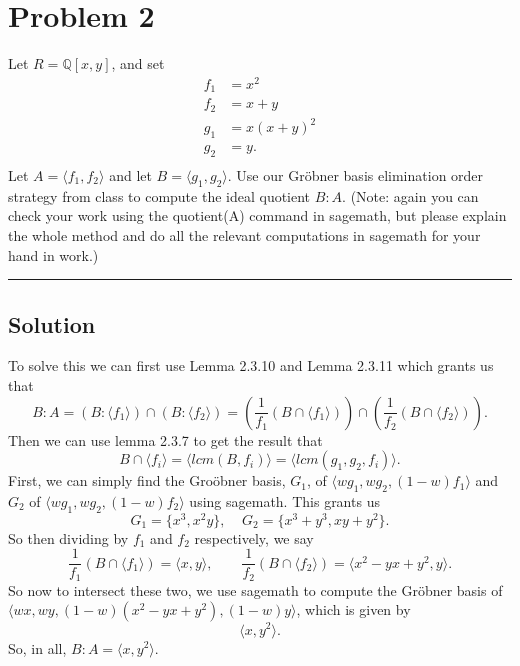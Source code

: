 \documentclass{article}
\theoremstyle{definition}
\begin{document}
\section*{Problem 2}
Let $R=\mathbb{Q}[x,y]$, and set 
\begin{align*}
f_1 &= x^2\\
f_2 &= x+y\\
g_1 &= x(x+y)^2\\
g_2 &= y.\\
\end{align*}
Let $A=\langle f_1,f_2 \rangle$ and let $B=\langle g_1, g_2 \rangle$.  Use our 
Gr\"obner basis elimination order strategy from class to compute the ideal quotient
$B:A$. (Note: again you can check your work using the quotient(A) command in 
sagemath, but please explain the whole method and do all the relevant computations 
in sagemath for your hand in work.)
\par\noindent\rule{\textwidth}{0.4pt}
\subsection*{Solution}
To solve this we can first use Lemma 2.3.10 and Lemma 2.3.11 which grants us that 
\[
    B : A = \left(B : \langle f_1 \rangle\right) \cap \left(B : \langle f_2 \rangle\right)
    = \left(\frac{1}{f_1}(B \cap \langle f_1 \rangle)\right) \cap \left(\frac{1}{f_2}(B \cap \langle f_2 \rangle)\right)
.\]
Then we can use lemma 2.3.7 to get the result that 
\[
B \cap \langle f_i \rangle = \langle lcm(B,f_i) \rangle
= \langle lcm(g_1,g_2,f_i) \rangle
.\]
First, we can simply find the Gro\"obner basis, $G_1$, of $\langle wg_1, wg_2, (1-w)f_1\rangle$ and 
$G_2$ of $\langle wg_1, wg_2, (1-w)f_2\rangle$
using sagemath. This grants us 
\[
    G_1 = \{x^3, x^2y\}, \ \ \ \ \ G_2 = \{x^3 + y^3, xy + y^2\}
.\]
So then dividing by $f_1$ and $f_2$ respectively, we say
\[
 \frac{1}{f_1}(B \cap \langle f_1\rangle) = \langle x, y \rangle, \ \ \ \ \ \ \ \ \
 \frac{1}{f_2}(B \cap \langle f_2 \rangle) = \langle x^2 - yx + y^2, y \rangle
.\]
So now to intersect these two, we use sagemath to compute the Gr\"obner basis of 
$\langle wx,wy, (1-w)(x^2 - yx + y^2), (1-w)y\rangle$, which is given by
\[
    \langle x, y^2 \rangle
.\]
So, in all, $B : A = \langle x, y^2 \rangle$.
\end{document}
